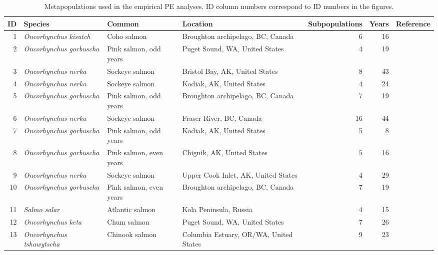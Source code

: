 \begin{table}[ht]
\begin{center}
\caption{Metapopulations used in the empirical PE analyses. ID column numbers correspond to ID numbers in the figures.}
\label{tab:datasources}
{\tiny
\begin{tabular}{rlllrrl}
  \toprule
ID & Species & Common & Location & Subpopulations & Years & Reference \\ 
  \midrule
  1 & \textit{Oncorhynchus kisutch} & Coho salmon & Broughton archipelago, BC, Canada &   6 &  16 & \citep{krkosek2011} \\ 
    2 & \textit{Oncorhynchus gorbuscha} & Pink salmon, odd years & Puget Sound, WA, United States &   4 &  19 & \citep{dorner2008} \\ 
    3 & \textit{Oncorhynchus nerka} & Sockeye salmon & Bristol Bay, AK, United States &   8 &  43 & \citep{west2006} \\ 
    4 & \textit{Oncorhynchus nerka} & Sockeye salmon & Kodiak, AK, United States &   4 &  24 & \citep{dorner2008} \\ 
    5 & \textit{Oncorhynchus gorbuscha} & Pink salmon, odd years & Broughton archipelago, BC, Canada &   7 &  19 & \citep{krkosek2011} \\ 
    6 & \textit{Oncorhynchus nerka} & Sockeye salmon & Fraser River, BC, Canada &  16 &  44 & \citep{dorner2008} \\ 
    7 & \textit{Oncorhynchus gorbuscha} & Pink salmon, odd years & Kodiak, AK, United States &   5 &   8 & \citep{dorner2008} \\ 
    8 & \textit{Oncorhynchus gorbuscha} & Pink salmon, even years & Chignik, AK, United States &   5 &  16 & \citep{dorner2008} \\ 
    9 & \textit{Oncorhynchus nerka} & Sockeye salmon & Upper Cook Inlet, AK, United States &   4 &  29 & \citep{fair2011} \\ 
   10 & \textit{Oncorhynchus gorbuscha} & Pink salmon, even years & Broughton archipelago, BC, Canada &   7 &  19 & \citep{krkosek2011} \\ 
   11 & \textit{Salmo salar} & Atlantic salmon & Kola Peninsula, Russia &   4 &  15 & \citep{jensen1999} \\ 
   12 & \textit{Oncorhynchus keta} & Chum salmon & Puget Sound, WA, United States &   7 &  26 & \citep{dorner2008} \\ 
   13 & \textit{Oncorhynchus tshawytscha} & Chinook salmon & Columbia Estuary, OR/WA, United States &   9 &  23 & \citep{streamnet2011} \\ 

\end{tabular}}
\end{center}
\end{table}
